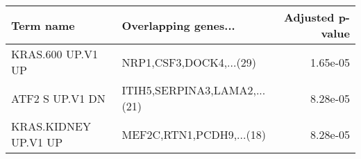 \begin{tabular}{llr}
\toprule
           Term name &         Overlapping genes... &  Adjusted p-value \\
\midrule
   KRAS.600 UP.V1 UP &      NRP1,CSF3,DOCK4,...(29) &          1.65e-05 \\
     ATF2 S UP.V1 DN & ITIH5,SERPINA3,LAMA2,...(21) &          8.28e-05 \\
KRAS.KIDNEY UP.V1 UP &     MEF2C,RTN1,PCDH9,...(18) &          8.28e-05 \\
\bottomrule
\end{tabular}
